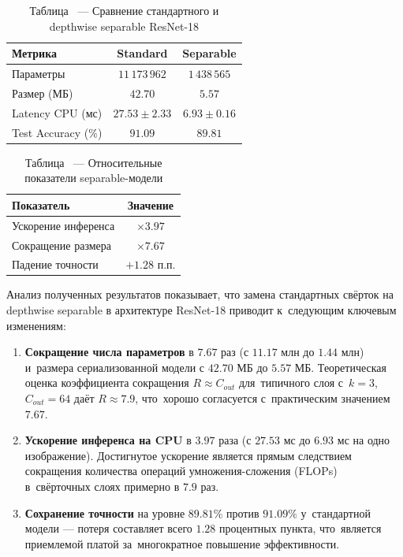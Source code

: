 \begin{table}[H]
    \centering
    \caption*{\raggedleft Таблица \thetable\ --- Сравнение стандартного и depthwise separable ResNet-18}
    \label{tab:results}
    \begin{tabular}{|l|c|c|}
        \hline
        \textbf{Метрика} & \textbf{Standard} & \textbf{Separable} \\
        \hline
        Параметры & $11\,173\,962$ & $1\,438\,565$ \\
        Размер (МБ) & $42.70$ & $5.57$ \\
        Latency CPU (мс) & $27.53 \pm 2.33$ & $6.93 \pm 0.16$ \\
        Test Accuracy (\%) & $91.09$ & $89.81$ \\
        \hline
    \end{tabular}
\end{table}

\begin{table}[H]
    \centering
    \caption*{\raggedleft Таблица \thetable\ --- Относительные показатели separable-модели}
    \label{tab:relative}
    \begin{tabular}{|l|c|}
        \hline
        \textbf{Показатель} & \textbf{Значение} \\
        \hline
        Ускорение инференса & $\times 3.97$ \\
        Сокращение размера & $\times 7.67$ \\
        Падение точности & $+1.28$ п.п. \\
        \hline
    \end{tabular}
\end{table}

Анализ полученных результатов показывает, что замена стандартных свёрток на depthwise separable в архитектуре ResNet-18 приводит к~следующим ключевым изменениям:

\begin{enumerate}
    \item \textbf{Сокращение числа параметров} в $7.67$ раз (с $11.17$ млн до $1.44$ млн) и~размера сериализованной модели с $42.70$ МБ до $5.57$ МБ. Теоретическая оценка коэффициента сокращения $R \approx C_{out}$ для~типичного слоя с~$k = 3$, $C_{out} = 64$ даёт $R \approx 7.9$, что~хорошо согласуется с~практическим значением $7.67$.
    \item \textbf{Ускорение инференса на CPU} в $3.97$ раза (с $27.53$ мс до $6.93$ мс на одно изображение). Достигнутое ускорение является прямым следствием сокращения количества операций умножения-сложения (FLOPs) в~свёрточных слоях примерно в $7.9$ раз.
    \item \textbf{Сохранение точности} на уровне $89.81\%$ против $91.09\%$ у~стандартной модели — потеря составляет всего $1.28$ процентных пункта, что~является приемлемой платой за~многократное повышение эффективности.
\end{enumerate}


